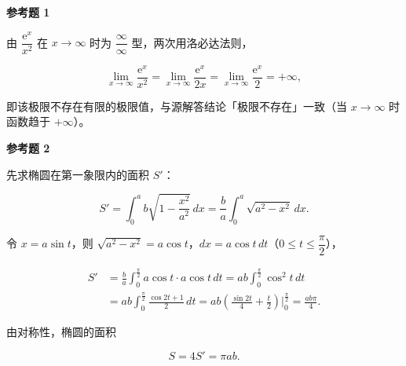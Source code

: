 \begin{answer}
\textbf{参考题 1}

由 $\dfrac{\mathrm e^x}{x^2}$ 在 $x\to\infty$ 时为 $\dfrac{\infty}{\infty}$ 型，两次用洛必达法则，

\nopagebreak[4]
\[
\lim_{x\to\infty}\frac{\mathrm e^x}{x^2}
=\lim_{x\to\infty}\frac{\mathrm e^x}{2x}
=\lim_{x\to\infty}\frac{\mathrm e^x}{2}=+\infty,
\]

即该极限不存在有限的极限值，与源解答结论「极限不存在」一致（当 $x\to\infty$ 时函数趋于 $+\infty$）。

\textbf{参考题 2}

先求椭圆在第一象限内的面积 $S'$：

\nopagebreak[4]
\[
S'=\int_0^a b\sqrt{1-\frac{x^2}{a^2}}\,dx
=\frac ba\int_0^a\sqrt{a^2-x^2}\,dx.
\]

令 $x=a\sin t$，则 $\sqrt{a^2-x^2}=a\cos t$，$dx=a\cos t\,dt$（$0\le t\le\dfrac{\pi}{2}$），

\nopagebreak[4]
\[
\begin{aligned}
S'&=\frac ba\int_0^{\frac{\pi}{2}}a\cos t\cdot a\cos t\,dt
=ab\int_0^{\frac{\pi}{2}}\cos^2t\,dt\\
&=ab\int_0^{\frac{\pi}{2}}\frac{\cos2t+1}{2}\,dt
=ab\left(\frac{\sin2t}{4}+\frac t2\right)\Bigg|_0^{\frac{\pi}{2}}
=\frac{ab\pi}{4}.
\end{aligned}
\]

由对称性，椭圆的面积

\nopagebreak[4]
\[
S=4S'=\pi ab.
\]


\end{answer}